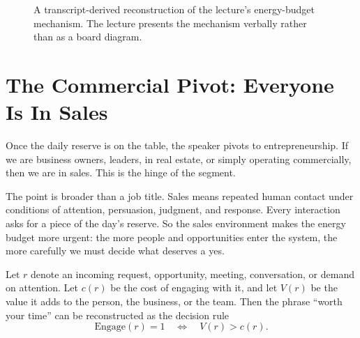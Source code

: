 \begin{figure}
\centering
{}
\caption{A transcript-derived reconstruction of the lecture's energy-budget mechanism. The lecture presents the mechanism verbally rather than as a board diagram.}
\end{figure}

\section{The Commercial Pivot: Everyone Is In Sales}

Once the daily reserve is on the table, the speaker pivots to entrepreneurship. If we are business owners, leaders, in real estate, or simply operating commercially, then we are in sales. This is the hinge of the segment.

The point is broader than a job title. Sales means repeated human contact under conditions of attention, persuasion, judgment, and response. Every interaction asks for a piece of the day's reserve. So the sales environment makes the energy budget more urgent: the more people and opportunities enter the system, the more carefully we must decide what deserves a yes.

Let \(r\) denote an incoming request, opportunity, meeting, conversation, or demand on attention. Let \(c(r)\) be the cost of engaging with it, and let \(V(r)\) be the value it adds to the person, the business, or the team. Then the phrase ``worth your time'' can be reconstructed as the decision rule
\begin{equation}
\mathrm{Engage}(r)=1
\quad\Longleftrightarrow\quad
V(r)>c(r).
\end{equation}

